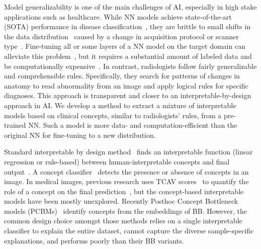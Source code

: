 Model generalizability is one of the main challenges of AI, especially in high stake applications such as healthcare. While NN models achieve state-of-the-art (SOTA) performance in disease classification~\cite{irvin2019chexpert, rajpurkar2017chexnet, yu2022anatomy}, they are brittle to small shifts in the data distribution~\cite{guan2021domain} caused by a change in acquisition protocol or scanner type~\cite{yan2020mri}. Fine-tuning all or some layers of a NN model on the target domain can alleviate this problem~\cite{chu2016best}, but it requires a substantial amount of labeled data and be computationally expensive~\cite{wang2017growing, kandel2020deeply}. In contrast, radiologists follow fairly generalizable and comprehensible rules. Specifically, they search for patterns of changes in anatomy to read abnormality from an image and apply logical rules for specific diagnoses. This approach is transparent and closer to an interpretable-by-design approach in AI. We develop a method to extract a mixture of interpretable models based on clinical concepts, similar to radiologists' rules, from a pre-trained NN. Such a model is more data- and computation-efficient than the original NN for fine-tuning to a new distribution.

 Standard interpretable by design method~\cite{rudin2022interpretable} finds an interpretable function (\eg linear regression or rule-based) between human-interpretable concepts and final output~\cite{koh2020concept}. A concept classifier~\cite{sarkar2021inducing, zarlenga2022concept} detects the presence or absence of concepts in an image. In medical images, previous research uses TCAV scores~\cite{kim2017interpretability} to quantify the role of a concept on the final prediction~\cite{yeche2019ubs, graziani2020concept, clough2019global}, but the concept-based interpretable models have been mostly unexplored.
Recently Posthoc Concept Bottleneck models (PCBMs)~\cite{yuksekgonul2022post} identify concepts from the embeddings of BB. However, the common design choice amongst those methods relies on a single interpretable classifier to explain the entire dataset, cannot capture the diverse sample-specific explanations, and performs poorly than their BB variants.

